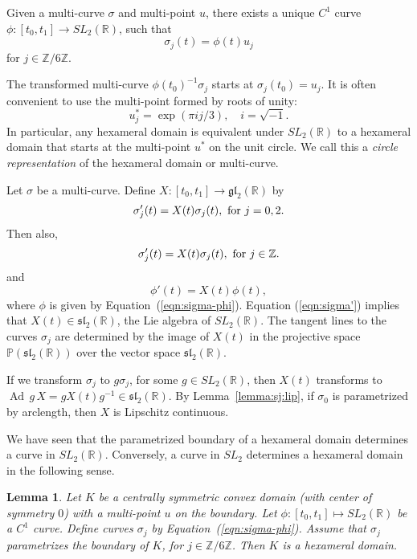 \documentclass[11pt]{amsart}
\newtheorem{lemma}[equation]{Lemma}
\def\op#1{{\operatorname{#1}}}
\newcommand{\ring}[1]{\mathbb{#1}}
\def\rZ{{\ring{Z}}}
\def\rR{{\ring{R}}}
\def\rP{{\ring{P}}}
\begin{document}
Given a multi-curve $\sigma$ and multi-point $u$, there exists a
unique $C^1$ curve $\phi:[t_0,t_1]\to SL_2(\ring{R})$, 
such that
   \begin{equation}\label{eqn:sigma-phi}
   \sigma_j(t) = \phi(t) u_j
   \end{equation}
for $j\in \ring{Z}/6\ring{Z}$.

The transformed multi-curve $\phi(t_0)^{-1} \sigma_j$
starts at 
$\sigma_j(t_0) = u_j$.
It is often convenient to use the multi-point formed by roots of unity:
\begin{equation}\label{eqn:roots}
u^*_j = \exp(\pi i j/3),\quad { i = \sqrt{-1} }.
\end{equation}
In particular, any hexameral domain is equivalent under
$SL_2(\ring{R})$ to a hexameral domain that starts at the multi-point
$u^*$ on the unit circle.  We call this a {\it circle representation}
of the hexameral domain or multi-curve.



Let $\sigma$ be a multi-curve.  Define $X:[t_0,t_1]\to\mathfrak{gl}_2(\rR)$
by
\[
\sigma'_j(t) = X(t)\sigma_j(t),\hbox{ for } j = 0,2.
\]
Then also,
\[
\sigma'_j(t) = X(t)\sigma_j(t),\hbox{ for } j\in\rZ.
\]
and
\begin{equation}\label{eqn:Xt}
\phi'(t) = X(t) \phi(t),
\end{equation}
where $\phi$ is given by Equation~(\ref{eqn:sigma-phi}).  Equation
(\ref{eqn:sigma'}) implies that $X(t)\in\mathfrak{sl}_2(\rR)$, the Lie
algebra of $SL_2(\rR)$.  The tangent lines to the curves $\sigma_j$
are determined by the image of $X(t)$ in the projective space
$\rP(\mathfrak{sl}_2(\rR))$ over the vector space
$\mathfrak{sl}_2(\rR)$.

If we transform $\sigma_j$ to $g\sigma_j$, for some $g\in SL_2(\rR)$,
then $X(t)$ transforms to $\op{Ad}\, g\, X = g X(t) g^{-1}\in \mathfrak{sl}_2(\rR)$.
By Lemma~\ref{lemma:sj:lip}, if $\sigma_0$ is parametrized by arclength, then
$X$ is Lipschitz continuous.

We have seen that the parametrized boundary of a hexameral domain
determines a curve in $SL_2(\ring{R})$.  Conversely, a curve in $SL_2$
determines a hexameral domain in the following sense.

\begin{lemma}\label{lemma:sl2-rein}  
  Let $K$ be a centrally symmetric convex domain (with center of
  symmetry $0$) with a multi-point $u$ on the boundary.  Let
  $\phi:[t_0,t_1]\mapsto SL_2(\ring{R})$ be a $C^1$ curve.  Define
  curves $\sigma_j$ by Equation~(\ref{eqn:sigma-phi}).  Assume that
  $\sigma_j$ parametrizes the boundary of $K$, for
  $j\in\ring{Z}/6\ring{Z}$.
Then
$K$ is a hexameral domain.
\end{lemma}
\end{document}
